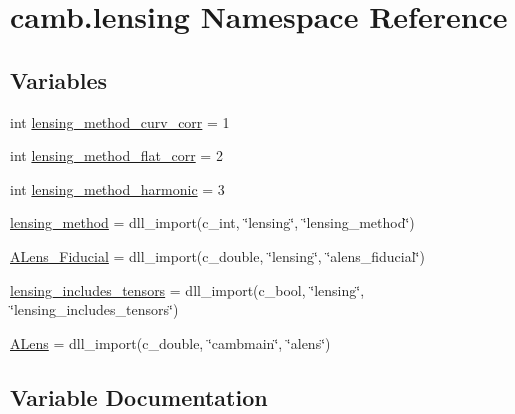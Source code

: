 \hypertarget{namespacecamb_1_1lensing}{}\section{camb.\+lensing Namespace Reference}
\label{namespacecamb_1_1lensing}
\subsection*{Variables}
\begin{DoxyCompactItemize}
\item 
int \mbox{\hyperlink{namespacecamb_1_1lensing_a7a64c15bdbd1b573c4f0bd9748414b5a}{lensing\+\_\+method\+\_\+curv\+\_\+corr}} = 1
\item 
int \mbox{\hyperlink{namespacecamb_1_1lensing_a6c58140a4a2e9c48b434647b666c0519}{lensing\+\_\+method\+\_\+flat\+\_\+corr}} = 2
\item 
int \mbox{\hyperlink{namespacecamb_1_1lensing_a110ff62de65df29f7299106986668681}{lensing\+\_\+method\+\_\+harmonic}} = 3
\item 
\mbox{\hyperlink{namespacecamb_1_1lensing_a5ff1b3b6974882491b201444ee34d025}{lensing\+\_\+method}} = dll\+\_\+import(c\+\_\+int, \char`\"{}lensing\char`\"{}, \char`\"{}lensing\+\_\+method\char`\"{})
\item 
\mbox{\hyperlink{namespacecamb_1_1lensing_a150cd2883812ce20539533de2b814352}{A\+Lens\+\_\+\+Fiducial}} = dll\+\_\+import(c\+\_\+double, \char`\"{}lensing\char`\"{}, \char`\"{}alens\+\_\+fiducial\char`\"{})
\item 
\mbox{\hyperlink{namespacecamb_1_1lensing_abaf178679c244ed0c64031b77f97038f}{lensing\+\_\+includes\+\_\+tensors}} = dll\+\_\+import(c\+\_\+bool, \char`\"{}lensing\char`\"{}, \char`\"{}lensing\+\_\+includes\+\_\+tensors\char`\"{})
\item 
\mbox{\hyperlink{namespacecamb_1_1lensing_a91c76ee287fe7ff092c8964500d8b112}{A\+Lens}} = dll\+\_\+import(c\+\_\+double, \char`\"{}cambmain\char`\"{}, \char`\"{}alens\char`\"{})
\end{DoxyCompactItemize}


\subsection{Variable Documentation}
\mbox{\label{namespacecamb_1_1lensing_a91c76ee287fe7ff092c8964500d8b112}} 
